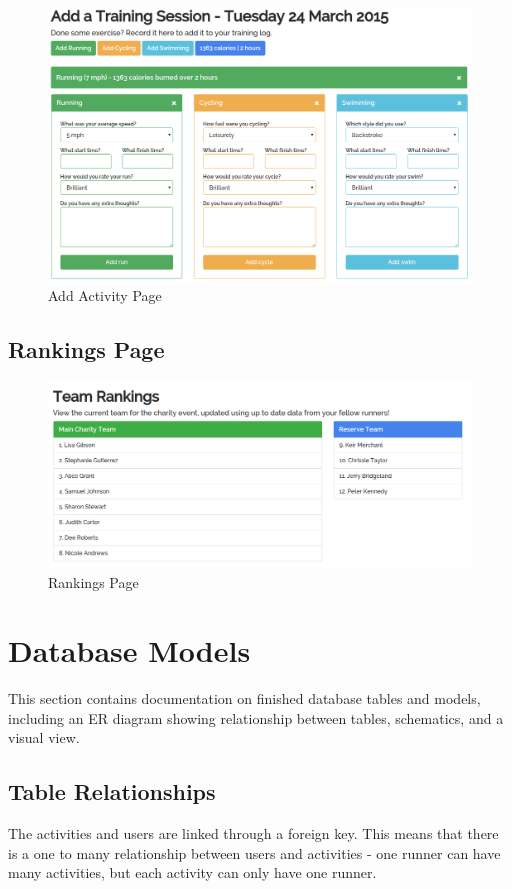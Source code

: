 \documentclass{article}[12pt,a4paper]
\begin{document}
\begin{figure}[h!]
  \includegraphics[scale=0.35]{final_ui/add_activity}
  \caption{Add Activity Page}
\end{figure}

\clearpage

\subsection{Rankings Page}

\begin{figure}[h!]
  \includegraphics[scale=0.35]{final_ui/rankings}
  \caption{Rankings Page}
\end{figure}

\clearpage

\section{Database Models}
This section contains documentation on finished database tables and models, including an ER diagram showing relationship between tables, schematics, and a visual view.

\subsection{Table Relationships}
The activities and users are linked through a foreign key. This means that there is a one to many relationship between users and activities - one runner can have many activities, but each activity can only have one runner.
\end{document}
